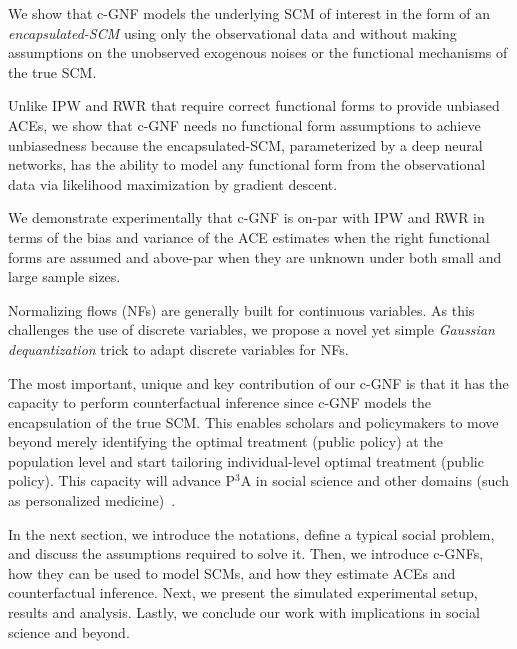 \documentclass[letterpaper]{article} %
\begin{document}
\begin{inparaenum}[1.]
    \item We show that c-GNF models the underlying SCM of interest in the form of an \emph{encapsulated-SCM} using only the observational data and without making assumptions on the unobserved exogenous noises or the functional mechanisms of the true SCM.

    \item Unlike IPW and RWR that require correct functional forms to provide unbiased ACEs, we show that c-GNF needs no functional form assumptions to achieve unbiasedness because the encapsulated-SCM, parameterized by a deep neural networks, has the ability to model any functional form from the observational data via likelihood maximization by gradient descent.


    \item We demonstrate experimentally that c-GNF is on-par with IPW and RWR in terms of the bias and variance of the ACE estimates when the right functional forms are assumed and above-par when they are unknown under both small and large sample sizes.%

    \item Normalizing flows (NFs) are generally built for continuous variables. As this challenges the use of discrete variables, we propose a novel yet simple \emph{Gaussian dequantization} trick to adapt discrete variables for NFs.

    \item The most important, unique and key contribution of our c-GNF is that it has the capacity to perform counterfactual inference since c-GNF models the encapsulation of the true SCM. This enables scholars and policymakers to move beyond merely identifying the optimal treatment (public policy) at the population level and start tailoring individual-level optimal treatment (public policy). This capacity will advance P$^3$A in social science and other domains (such as personalized medicine)~\cite{kino2021adelmlreview}.

\end{inparaenum}

In the next section, we introduce the notations, define a typical social problem, and discuss the assumptions required to solve it. Then, we introduce c-GNFs, how they can be used to model SCMs, and how they estimate ACEs and counterfactual inference. Next, we present the simulated experimental setup, results and analysis. %
Lastly, we conclude our work with implications in social science and beyond.
\end{document}
